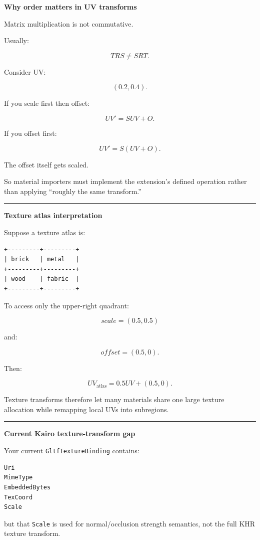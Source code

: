 \textbf{Why order matters in UV transforms}

Matrix multiplication is not commutative.

Usually:

\[
TRS
\neq
SRT.
\]

Consider UV:

\[
(0.2,0.4).
\]

If you scale first then offset:

\[
UV'=S UV+O.
\]

If you offset first:

\[
UV'=S(UV+O).
\]

The offset itself gets scaled.

So material importers must implement the extension's defined operation rather than applying ``roughly the same transform.''

\begin{center}\rule{0.5\linewidth}{0.5pt}\end{center}

\textbf{Texture atlas interpretation}

Suppose a texture atlas is:

\begin{verbatim}
+---------+---------+
| brick   | metal   |
+---------+---------+
| wood    | fabric  |
+---------+---------+
\end{verbatim}

To access only the upper-right quadrant:

\[
scale=(0.5,0.5)
\]

and:

\[
offset=(0.5,0).
\]

Then:

\[
UV_{\text{atlas}}
=
0.5UV+
(0.5,0).
\]

Texture transforms therefore let many materials share one large texture allocation while remapping local UVs into subregions.

\begin{center}\rule{0.5\linewidth}{0.5pt}\end{center}

\textbf{Current Kairo texture-transform gap}

Your current \texttt{GltfTextureBinding} contains:

\begin{verbatim}
Uri
MimeType
EmbeddedBytes
TexCoord
Scale
\end{verbatim}

but that \texttt{Scale} is used for normal/occlusion strength semantics, not the full KHR texture transform.

